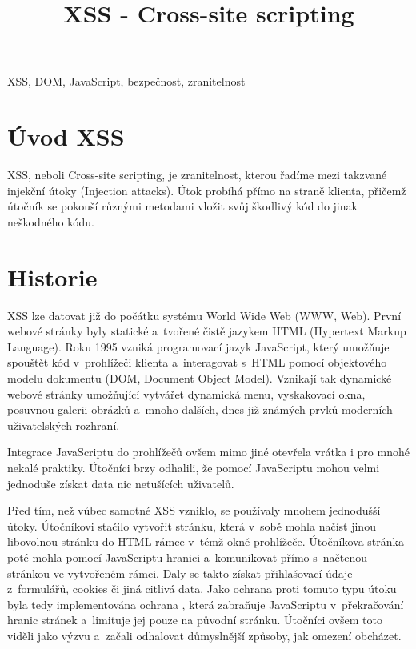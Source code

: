 \documentclass[11pt,conference]{IEEEtran}
\begin{document}
\title{XSS \-- Cross\--site scripting}

\author{
}
\maketitle

\begin{abstract}

\end{abstract}

\begin{IEEEkeywords}
XSS, DOM, JavaScript, bezpečnost, zranitelnost
\end{IEEEkeywords}

\section{Úvod XSS}
XSS, neboli Cross-site scripting, je zranitelnost, kterou řadíme mezi takzvané injekční útoky (Injection attacks). Útok probíhá přímo na straně klienta, přičemž útočník se pokouší různými metodami vložit svůj škodlivý kód do jinak neškodného kódu.



\section{Historie}
XSS lze datovat již do počátku systému World Wide Web (WWW, Web). První webové stránky byly statické a~tvořené čistě jazykem HTML (Hypertext Markup Language). Roku 1995 vzniká programovací jazyk JavaScript, který umožňuje spouštět kód v~prohlížeči klienta a~interagovat s~HTML pomocí objektového modelu dokumentu (DOM,  Document Object Model). Vznikají tak dynamické webové stránky umožňující vytvářet dynamická menu, vyskakovací okna, posuvnou galerii obrázků a~mnoho dalších, dnes již známých prvků moderních uživatelských rozhraní. 

Integrace JavaScriptu do prohlížečů ovšem mimo jiné otevřela vrátka i pro mnohé nekalé praktiky. Útočníci brzy odhalili, že pomocí JavaScriptu mohou velmi jednoduše získat data nic netušících uživatelů. 

Před tím, než vůbec samotné XSS vzniklo, se používaly mnohem jednodušší útoky. Útočníkovi stačilo vytvořit stránku, která v~sobě mohla načíst jinou libovolnou stránku do HTML rámce v~témž okně prohlížeče. Útočníkova stránka poté mohla pomocí JavaScriptu  hranici a~komunikovat přímo s~načtenou stránkou ve vytvořeném rámci. Daly se takto získat přihlašovací údaje z~formulářů, cookies či jiná citlivá data. Jako ochrana proti tomuto typu útoku byla tedy implementována ochrana , která zabraňuje JavaScriptu v~překračování hranic stránek a~limituje jej pouze na původní stránku. Útočníci ovšem toto viděli jako výzvu a~začali odhalovat důmyslnější způsoby, jak omezení obcházet.
\end{document}
